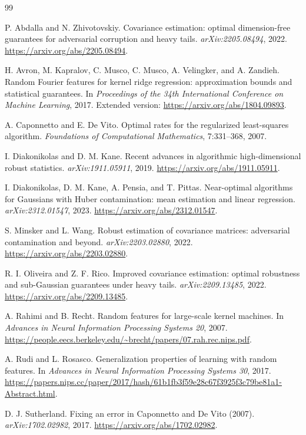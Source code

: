 \documentclass[11pt]{article}
\begin{document}
\begin{thebibliography}{99}

P. Abdalla and N. Zhivotovskiy.
\newblock Covariance estimation: optimal dimension-free guarantees for
adversarial corruption and heavy tails.
\newblock \emph{arXiv:2205.08494}, 2022.
\newblock \url{https://arxiv.org/abs/2205.08494}.

H. Avron, M. Kapralov, C. Musco, C. Musco, A. Velingker, and A. Zandieh.
\newblock Random Fourier features for kernel ridge regression: approximation
bounds and statistical guarantees.
\newblock In \emph{Proceedings of the 34th International Conference on Machine
Learning}, 2017.  Extended version: \url{https://arxiv.org/abs/1804.09893}.

A. Caponnetto and E. De Vito.
\newblock Optimal rates for the regularized least-squares algorithm.
\newblock \emph{Foundations of Computational Mathematics}, 7:331--368, 2007.

I. Diakonikolas and D. M. Kane.
\newblock Recent advances in algorithmic high-dimensional robust statistics.
\newblock \emph{arXiv:1911.05911}, 2019.
\newblock \url{https://arxiv.org/abs/1911.05911}.

I. Diakonikolas, D. M. Kane, A. Pensia, and T. Pittas.
\newblock Near-optimal algorithms for Gaussians with Huber contamination: mean
estimation and linear regression.
\newblock \emph{arXiv:2312.01547}, 2023.
\newblock \url{https://arxiv.org/abs/2312.01547}.

S. Minsker and L. Wang.
\newblock Robust estimation of covariance matrices: adversarial contamination
and beyond.
\newblock \emph{arXiv:2203.02880}, 2022.
\newblock \url{https://arxiv.org/abs/2203.02880}.

R. I. Oliveira and Z. F. Rico.
\newblock Improved covariance estimation: optimal robustness and sub-Gaussian
guarantees under heavy tails.
\newblock \emph{arXiv:2209.13485}, 2022.
\newblock \url{https://arxiv.org/abs/2209.13485}.

A. Rahimi and B. Recht.
\newblock Random features for large-scale kernel machines.
\newblock In \emph{Advances in Neural Information Processing Systems 20}, 2007.
\newblock \url{https://people.eecs.berkeley.edu/~brecht/papers/07.rah.rec.nips.pdf}.

A. Rudi and L. Rosasco.
\newblock Generalization properties of learning with random features.
\newblock In \emph{Advances in Neural Information Processing Systems 30}, 2017.
\newblock \url{https://papers.nips.cc/paper/2017/hash/61b1fb3f59e28c67f3925f3c79be81a1-Abstract.html}.

D. J. Sutherland.
\newblock Fixing an error in Caponnetto and De Vito (2007).
\newblock \emph{arXiv:1702.02982}, 2017.
\newblock \url{https://arxiv.org/abs/1702.02982}.

\end{thebibliography}
\end{document}
